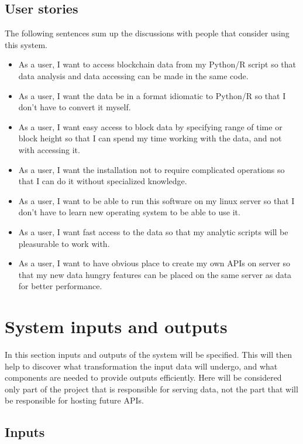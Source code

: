 \documentclass[12pt, en, eng, oneside]{mgr}
\begin{document}
\subsection{User stories}

The following sentences sum up the discussions with people that consider using this system.

\begin{itemize}
\item
As a user, I want to access blockchain data from my Python/R script so that data analysis and data accessing can be made in the same code.
\item
As a user, I want the data be in a format idiomatic to Python/R so that I don't have to convert it myself.
\item
As a user, I want easy access to block data by specifying range of time or block height so that I can spend my time working with the data, and not with accessing it.
\item
As a user, I want the installation not to require complicated operations so that I can do it without specialized knowledge.
\item
As a user, I want to be able to run this software on my linux server so that I don't have to learn new operating system to be able to use it.
\item
As a user, I want fast access to the data so that my analytic scripts will be pleasurable to work with.
\item
As a user, I want to have obvious place to create my own APIs on server so that my new data hungry features can be placed on the same server as data for better performance.
\end{itemize}



\section{System inputs and outputs}

In this section inputs and outputs of the system will be specified. This will then help to discover what transformation the input data will undergo, and what components are needed to provide outputs efficiently. Here will be considered only part of the project that is responsible for serving data, not the part that will be responsible for hosting future APIs.

\subsection{Inputs}
\end{document}

